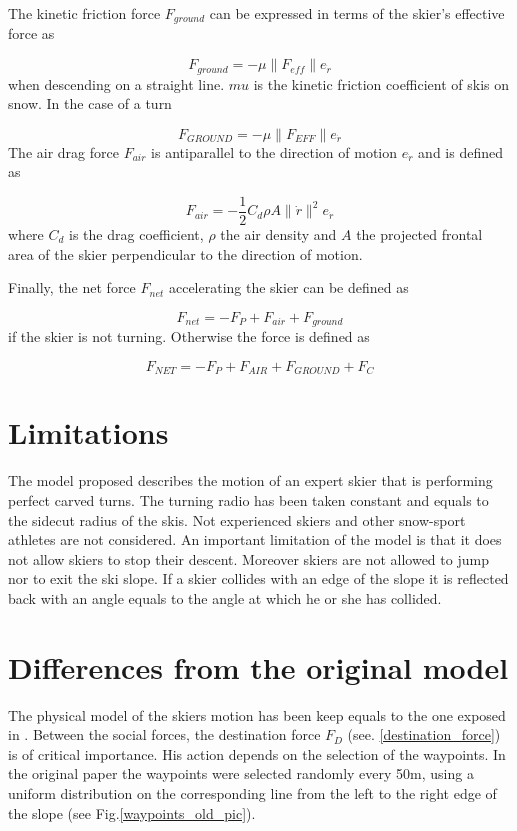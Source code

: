 \documentclass[12pt,a4paper,twoside]{book}
\newcommand{\norm}[1]{\lVert#1\rVert}
\begin{document}
The kinetic friction force $F_{ground}$ can be expressed in terms of the skier's effective force as

\begin{equation}
F_{ground}=-\mu \norm{F_{eff}}e_{\dot{r}}
\end{equation}
when descending on a straight line. $mu$ is the kinetic friction coefficient of skis on snow. In the case of a turn

\begin{equation}
F_{GROUND}=-\mu \norm{F_{EFF}}e_{\dot{r}}
\end{equation}
The air drag force $F_{air}$ is antiparallel to the direction of motion $e_{\dot{r}}$ and is defined as

\begin{equation}
F_{air}=-\frac{1}{2}C_d \rho A \norm{\dot{r}}^2 e_{\dot{r}}
\end{equation}
where $C_d$ is the drag coefficient, $\rho$ the air density and $A$ the projected frontal area of the skier perpendicular to the direction of motion.

Finally, the net force $F_{net}$ accelerating the skier can be defined as

\begin{equation}
F_{net}=-F_P + F_{air} + F_{ground}
\end{equation}
if the skier is not turning. Otherwise the force is defined as

\begin{equation}
F_{NET}=-F_P + F_{AIR} + F_{GROUND} + F_C
\end{equation}

\section{Limitations}
The model proposed describes the motion of an expert skier that is performing perfect carved turns. The turning radio has been taken constant and equals to the sidecut radius of the skis. Not experienced skiers and other snow-sport athletes are not considered. An important limitation of the model is that it does not allow skiers to stop their descent.  Moreover skiers are not allowed to jump nor to exit the ski slope. If a skier collides with an edge of the slope it is reflected back with an angle equals to the angle at which he or she has collided.

\section{Differences from the original model}
The physical model of the skiers motion has been keep equals to the one exposed in \cite{hol2012}. Between the social forces, the destination force $F_D$ (see. \ref{destination_force}) is of critical importance. His action depends on  the selection of the waypoints. In the original paper the waypoints were selected randomly every 50m, using a uniform distribution on the corresponding line from the left to the right edge of the slope (see Fig.\ref{waypoints_old_pic}).
\end{document}
